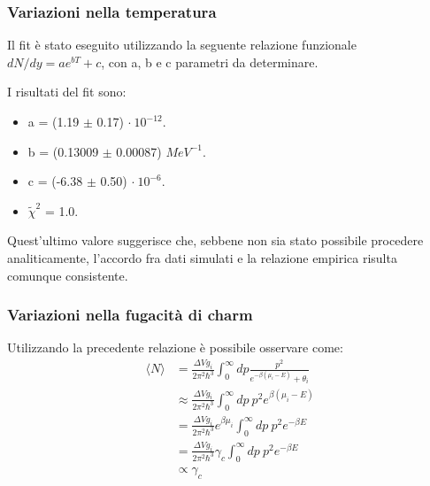\documentclass[11pt]{beamer}
\begin{document}
	
	\begin{frame}
		\frametitle{Variazioni nella temperatura}
		
		Il fit è stato eseguito utilizzando la seguente relazione funzionale 
		$dN/dy = a e^{bT} + c$, con a, b e c parametri da determinare. 
		
		I risultati del fit sono:
		
		\begin{itemize}
			\item a = (1.19 $\pm$ 0.17) $\cdot \ 10^{-12}$.
			\item b = (0.13009 $\pm$ 0.00087) $MeV^{-1}$.
			\item c = (-6.38 $\pm$ 0.50) $\cdot \ 10^{-6}$.
			\item $\tilde{\chi}^2$ = 1.0.
		\end{itemize}
		
		Quest'ultimo valore suggerisce che, sebbene non sia stato possibile procedere analiticamente, l'accordo fra dati simulati e la relazione empirica risulta comunque consistente.
		
	\end{frame}
	
	\begin{frame}
		\frametitle{Variazioni nella fugacità di charm}
		Utilizzando la precedente relazione è possibile osservare come:
		\begin{equation}
			\begin{aligned}
				\langle N \rangle &= \frac{\Delta V g_i}{2\pi^2\hbar^3} 
				\int_{0}^{\infty} dp 
				\frac{p^2}{e^{-\beta(\mu_i-E)}+\theta_i} \\
				&\approx \frac{\Delta V g_i}{2\pi^2\hbar^3} 
				\int_{0}^{\infty} dp \ p^2 e^{\beta(\mu_i-E)} \\
				&= \frac{\Delta V g_i}{2\pi^2\hbar^3} e^{\beta \mu_i} 
				\int_{0}^{\infty} dp \ p^2 e^{-\beta E} \\
				&= \frac{\Delta V g_i}{2\pi^2\hbar^3} \gamma_c 
				\int_{0}^{\infty} dp \ p^2 e^{-\beta E}\\
				&\propto \gamma_c
			\end{aligned}
		\end{equation} 
	\end{frame}
	
\end{document}
